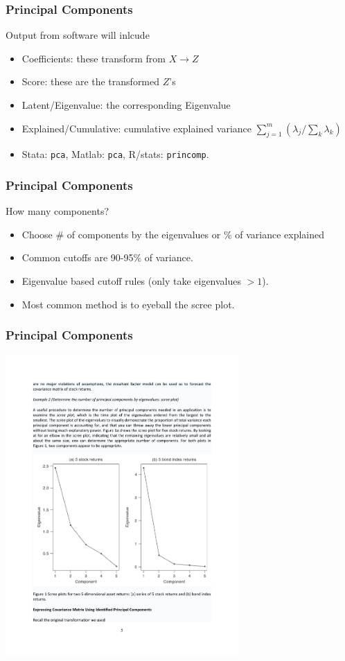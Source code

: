 \begin{frame}
\frametitle{Principal Components}
Output from software will inlcude
\begin{itemize}
\item Coefficients: these transform from $X\rightarrow Z$
\item Score: these are the transformed $Z$'s
\item Latent/Eigenvalue: the corresponding Eigenvalue
\item Explained/Cumulative: cumulative explained variance $ \sum_{j=1}^m( \lambda_j / \sum_k \lambda_k)$
\item Stata: \texttt{pca}, Matlab: \texttt{pca}, R/stats: \texttt{princomp}.
\end{itemize}
\end{frame}

\begin{frame}
\frametitle{Principal Components}
How many components?
\begin{itemize}
\item Choose \# of components by the eigenvalues or \% of variance explained
\item Common cutoffs are 90-95\% of variance.
\item Eigenvalue based cutoff rules (only take eigenvalues $ > 1$).
\item Most common method is to eyeball the scree plot.
\end{itemize}
\end{frame}


\begin{frame}
\frametitle{Principal Components}
\begin{center}
\includegraphics[width=3.5in]{./resources/princomp1}
\end{center}
\end{frame}

